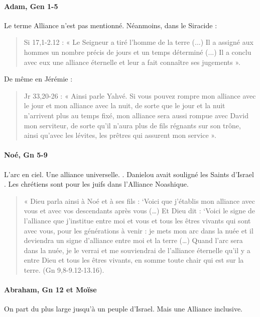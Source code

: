 \paragraph{ Adam, Gen 1-5} Le terme Alliance n'est pas mentionné. Néanmoins, dans le Siracide : 
      \begin{quote}
          Si 17,1-2.12 : « Le Seigneur a tiré l’homme de la terre (...) Il a assigné aux hommes un nombre précis de jours et un temps déterminé (...) Il a conclu avec
eux une alliance éternelle et leur a fait connaître ses jugements ».
      \end{quote}
      De même en Jérémie : 
      \begin{quote}
          Jr 33,20-26 : « Ainsi parle Yahvé. Si vous pouvez rompre mon alliance avec le
jour et mon alliance avec la nuit, de sorte que le jour et la nuit n’arrivent plus
au temps fixé, mon alliance sera aussi rompue avec David mon serviteur, de
sorte qu’il n’aura plus de fils régnants sur son trône, ainsi qu’avec les lévites,
les prêtres qui assurent mon service ».
      \end{quote}
     
      
\paragraph{Noé, Gn 5-9} L'arc en ciel. Une alliance universelle. \pageref{Alterite}. Danielou avait souligné les Saints d'Israel . Les chrétiens sont pour les juifs dans l'Alliance Noashique. 
      \begin{quote}
          « Dieu parla ainsi à Noé et à ses fils : `Voici que j'établis mon
alliance avec vous et avec vos descendants après vous (\ldots) Et Dieu
dit : `Voici le signe de l'alliance que j'institue entre moi et vous et
tous les êtres vivants qui sont avec vous, pour les générations à venir
: je mets mon  arc dans la nuée et il deviendra un signe d'alliance entre moi et la
terre (\ldots) Quand l'arc sera dans la nuée, je le verrai et me
souviendrai de l'alliance éternelle qu'il y a entre Dieu et tous les
êtres vivants, en somme toute chair qui est sur la terre. (Gn
9,8-9.12-13.16).
      \end{quote}
     
      
\paragraph{Abraham, Gn 12 et Moïse}
      
  
\begin{Synthesis}
On part du plus large jusqu'à un peuple d'Israel. Mais une Alliance inclusive.
\end{Synthesis}   
    
